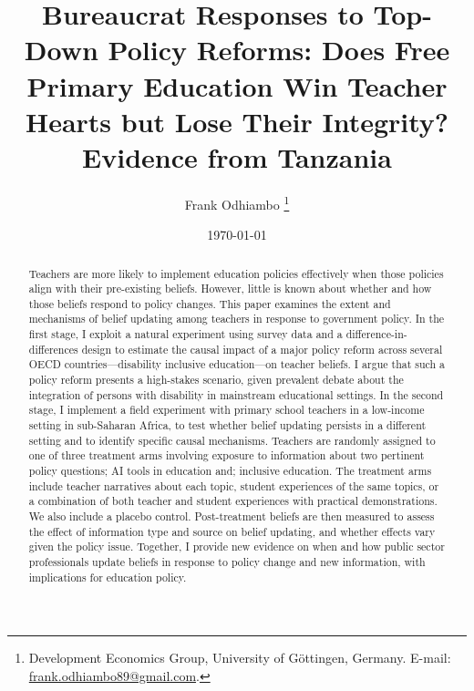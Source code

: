 \documentclass[hidelinks,12pt]{article}
\begin{document}
\begin{singlespace}

\begin{titlepage}
\title{Bureaucrat Responses to Top-Down Policy Reforms: Does Free Primary Education Win Teacher Hearts but Lose Their Integrity? Evidence from Tanzania}

\author{Frank Odhiambo \thanks{Development Economics Group, University of G\"ottingen, Germany. E-mail: \href{mailto:frank.odhiambo89@gmail.com}{frank.odhiambo89@gmail.com}.}}

\date{\today}
\maketitle
\begin{abstract}
\begin{singlespace}
Teachers are more likely to implement education policies effectively when those policies align with their pre-existing beliefs. However, little is known about whether and how those beliefs respond to policy changes. This paper examines the extent and mechanisms of belief updating among teachers in response to government policy. In the first stage, I exploit a natural experiment using survey data and a difference-in-differences design to estimate the causal impact of a major policy reform across several OECD countries—disability inclusive education—on teacher beliefs. I argue that such a policy reform presents a high-stakes scenario, given prevalent debate about the integration of persons with disability in mainstream educational settings. In the second stage, I implement a field experiment with primary school teachers in a low-income setting in sub-Saharan Africa, to test whether belief updating persists in a different setting and to identify specific causal mechanisms. Teachers are randomly assigned to one of three treatment arms involving exposure to information about two pertinent policy questions; AI tools in education and; inclusive education. The treatment arms include teacher narratives about each topic, student experiences of the same topics, or a combination of both teacher and student experiences with practical demonstrations. We also include a placebo control. Post-treatment beliefs are then measured to assess the effect of information type and source on belief updating, and whether effects vary given the policy issue. Together, I provide new evidence on when and how public sector professionals update beliefs in response to policy change and new information, with implications for education policy. \\
\end{singlespace}


\end{abstract}
\end{titlepage}
\end{singlespace}
\end{document}
